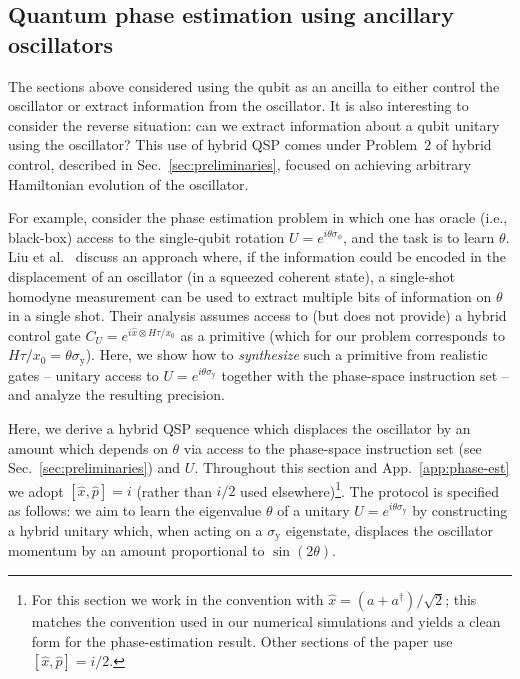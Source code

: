 \documentclass[aps,prx,showpacs,notitlepage,twocolumn,superscriptaddress,nofootinbib,preprintnumbers,floatfix,10pt, longbibliography]{revtex4-2}
\begin{document}
\subsection{Quantum phase estimation using ancillary oscillators}
\label{sssec:quantum-phase-estimation}
The sections above considered using the qubit as an ancilla to either control the oscillator or extract information from the oscillator. It is also interesting to consider the reverse situation: can we extract information about a qubit unitary using the oscillator? This use of hybrid QSP comes under Problem~$2$ of hybrid control, described in Sec.~\ref{sec:preliminaries}, focused on achieving arbitrary Hamiltonian evolution of the oscillator.

For example, consider the phase estimation problem in which one has oracle (i.e., black-box) access to the single-qubit rotation $U=e^{i\theta\sigma_\phi}$, and the task is to learn $\theta$. 
Liu et al.~\cite{liu2016power} discuss an approach where, if the information could be %
encoded in the displacement of an oscillator (in a squeezed coherent state), a single-shot homodyne measurement can be used to extract multiple bits of information on $\theta$ in a single shot. Their analysis assumes access to (but does not provide) a hybrid control gate $C_U=e^{i\hat{x}\otimes H\tau/x_0}$ as a primitive (which for our problem corresponds to $H\tau/x_0 =\theta\sigma_\mathrm{y}$). Here, we show how to \emph{synthesize} such a primitive from realistic gates -- unitary access to $U=e^{i\theta\sigma_\mathrm{y}}$ together with the phase-space instruction set -- and analyze the resulting precision.

Here, we derive a hybrid QSP sequence which displaces the oscillator by an amount which depends on $\theta$ via access to the phase-space instruction set (see Sec.~\ref{sec:preliminaries}) and $U$. Throughout this section and App.~\ref{app:phase-est} we adopt $[\hat{x},\hat{p}]=i$
 (rather than $i/2$ used elsewhere)\footnote{For this section we work in the convention with $\hat{x}=(a+a^\dagger)/\sqrt{2}$; this matches the convention used in our numerical simulations and yields a clean form for the phase-estimation result. Other sections of the paper use $[\hat{x},\hat{p}]=i/2$.}. The protocol is specified as follows: we aim to learn the eigenvalue $\theta$ of a unitary $U=e^{i\theta\sigma_\mathrm{y}}$ by constructing a hybrid unitary which, when acting on a $\sigma_\mathrm{y}$ eigenstate, displaces the oscillator momentum by an amount proportional to $\sin(2\theta)$.
\end{document}
